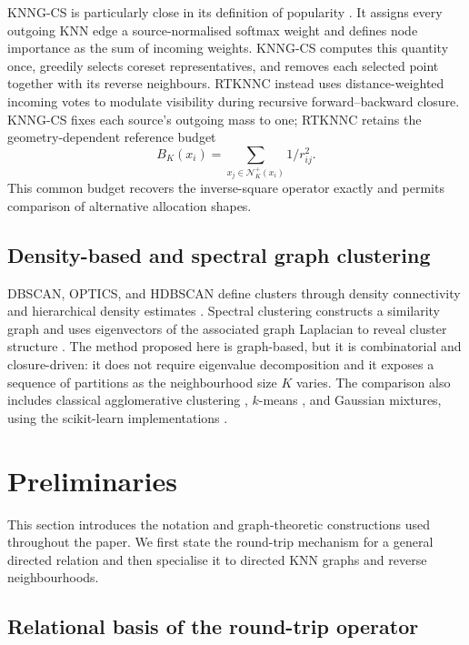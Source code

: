 \documentclass[review,12pt]{elsarticle}
\newcommand{\calN}{\mathcal{N}}
\begin{document}
KNNG-CS is particularly close in its definition of popularity \citep{LiuEtAl2026KNNGCS}. It assigns every outgoing KNN edge a source-normalised softmax weight and defines node importance as the sum of incoming weights. KNNG-CS computes this quantity once, greedily selects coreset representatives, and removes each selected point together with its reverse neighbours. RTKNNC instead uses distance-weighted incoming votes to modulate visibility during recursive forward--backward closure. KNNG-CS fixes each source's outgoing mass to one; RTKNNC retains the geometry-dependent reference budget
\[
B_K(x_i)=\sum_{x_j\in\calN_K^+(x_i)}1/r_{ij}^2.
\] This common budget recovers the inverse-square operator exactly and permits comparison of alternative allocation shapes.

\subsection{Density-based and spectral graph clustering}

DBSCAN, OPTICS, and HDBSCAN define clusters through density connectivity and hierarchical density estimates \citep{Ester1996DBSCAN,Ankerst1999OPTICS,Campello2013HDBSCAN,CampelloMoulaviZimekSander2015}. Spectral clustering constructs a similarity graph and uses eigenvectors of the associated graph Laplacian to reveal cluster structure \citep{NgJordanWeiss2002,VonLuxburg2007}. The method proposed here is graph-based, but it is combinatorial and closure-driven: it does not require eigenvalue decomposition and it exposes a sequence of partitions as the neighbourhood size $K$ varies.
The comparison also includes classical agglomerative clustering
\citep{MurtaghContreras2012}, $k$-means \citep{Lloyd1982,MacQueen1967}, and
Gaussian mixtures, using the scikit-learn implementations
\citep{PedregosaEtAl2011}.

\section{Preliminaries}\label{sec:preliminaries}

This section introduces the notation and graph-theoretic constructions used throughout the paper. We first state the round-trip mechanism for a general directed relation and then specialise it to directed KNN graphs and reverse neighbourhoods.

\subsection{Relational basis of the round-trip operator}\label{sec:relational_origin}
\end{document}
